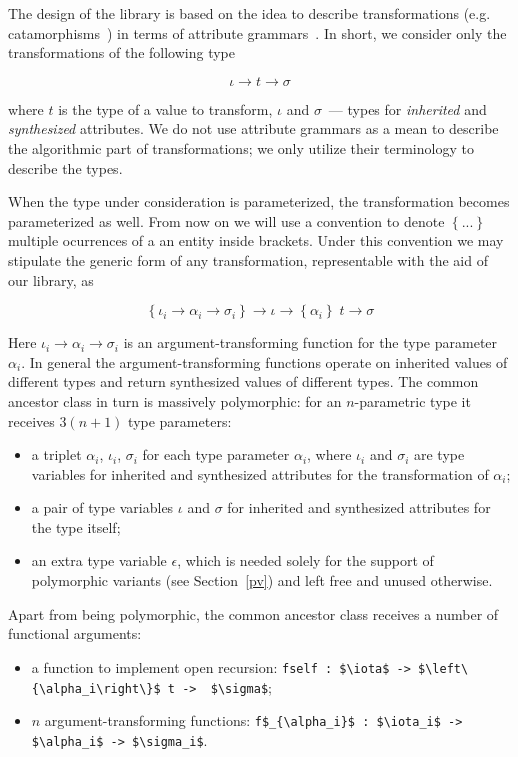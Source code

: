The design of the library is based on the idea to describe transformations (e.g. catamorphisms~\cite{Bananas}) in terms of attribute grammars~\cite{AGKnuth,AGSwierstra,ObjectAlgebrasAttribute}.
In short, we consider only the transformations of the following type

\[
\iota \to t \to \sigma
\]

where $t$ is the type of a value to transform, $\iota$ and $\sigma$~--- types for \emph{inherited} and \emph{synthesized} attributes. We do not use attribute
grammars as a mean to describe the algorithmic part of transformations; we only utilize their terminology to describe the types. 

When the type under consideration is parameterized, the transformation becomes parameterized as well. From now on we will use a convention to
denote $\left\{...\right\}$ multiple ocurrences of a an entity inside brackets. Under this convention we may stipulate the generic form of
any transformation, representable with the aid of our library, as

\[
  \left\{\iota_i \to \alpha_i \to \sigma_i\right\}\to\iota \to\left\{\alpha_i\right\}\;t \to \sigma
\]

Here $\iota_i\to\alpha_i\to\sigma_i$ is an argument-transforming function for the type parameter $\alpha_i$. In general the argument-transforming functions operate on
inherited values of different types and return synthesized values of different types. The common ancestor class in turn is massively polymorphic: for an $n$-parametric
type it receives $3(n+1)$ type parameters:

\begin{itemize}
\item a triplet $\alpha_i$, $\iota_i$, $\sigma_i$ for each type parameter $\alpha_i$, where $\iota_i$ and $\sigma_i$ are type variables for inherited and
  synthesized attributes for the transformation of $\alpha_i$;
\item a pair of type variables $\iota$ and $\sigma$ for inherited and synthesized attributes for the type itself;
\item an extra type variable $\epsilon$, which is needed solely for the support of polymorphic variants (see Section~\ref{pv}) and left free and unused
  otherwise.
\end{itemize}

Apart from being polymorphic, the common ancestor class receives a number of functional arguments:

\begin{itemize}
\item a function to implement open recursion: \lstinline|fself : $\iota$ -> $\left\{\alpha_i\right\}$ t ->  $\sigma$|;
\item $n$ argument-transforming functions: \lstinline|f$_{\alpha_i}$ : $\iota_i$ -> $\alpha_i$ -> $\sigma_i$|.
\end{itemize}

